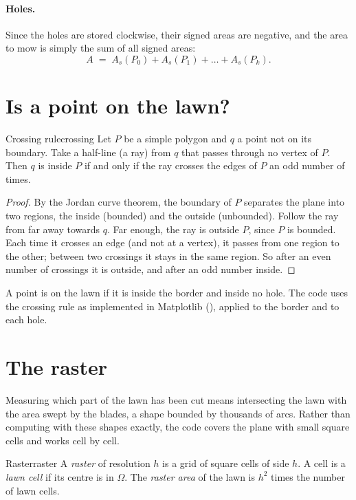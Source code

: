\paragraph{Holes.}
Since the holes are stored clockwise, their signed areas are negative, and the
area to mow is simply the sum of all signed areas:
\[
  A \;=\; A_s(P_0) + A_s(P_1) + \dots + A_s(P_k).
\]

\section{Is a point on the lawn?}

\begin{proposition}{Crossing rule}{crossing}
  Let $P$ be a simple polygon and $q$ a point not on its boundary. Take a
  half-line (a ray) from $q$ that passes through no vertex of $P$. Then $q$ is
  inside $P$ if and only if the ray crosses the edges of $P$ an odd number of
  times.
\end{proposition}

\begin{proof}
  By the Jordan curve theorem, the boundary of $P$ separates the plane into
  two regions, the inside (bounded) and the outside (unbounded). Follow the
  ray from far away towards $q$. Far enough, the ray is outside $P$, since
  $P$ is bounded. Each time it crosses an edge (and not at a vertex), it
  passes from one region to the other; between two crossings it stays in the
  same region. So after an even number of crossings it is outside, and after
  an odd number inside.
\end{proof}

A point is on the lawn if it is inside the border and inside no hole. The
code uses the crossing rule as implemented in Matplotlib
(), applied to the border and to each hole.

\section{The raster}
\label{sec:raster}

Measuring which part of the lawn has been cut means intersecting the lawn
with the area swept by the blades, a shape bounded by thousands of arcs.
Rather than computing with these shapes exactly, the code covers the plane
with small square cells and works cell by cell.

\begin{definition}{Raster}{raster}
  A \emph{raster} of resolution $h$ is a grid of square cells of side $h$. A
  cell is a \emph{lawn cell} if its centre is in $\Omega$. The \emph{raster
  area} of the lawn is $h^2$ times the number of lawn cells.
\end{definition}

